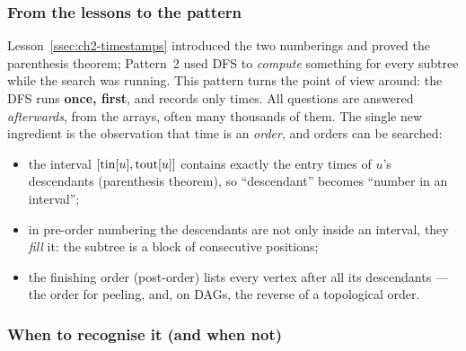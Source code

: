\subsubsection*{From the lessons to the pattern}

Lesson~\ref{ssec:ch2-timestamps} introduced the two numberings and proved the parenthesis theorem; Pattern~2 used DFS to \emph{compute} something for every subtree while the search was running. This pattern turns the point of view around: the DFS runs \textbf{once, first}, and records only times. All questions are answered \emph{afterwards}, from the arrays, often many thousands of them. The single new ingredient is the observation that time is an \emph{order}, and orders can be searched:
\begin{itemize}[leftmargin=*]
    \item the interval $[\mathrm{tin}[u], \mathrm{tout}[u]]$ contains exactly the entry times of $u$'s descendants (parenthesis theorem), so ``descendant'' becomes ``number in an interval'';
    \item in pre-order numbering the descendants are not only inside an interval, they \emph{fill} it: the subtree is a block of consecutive positions;
    \item the finishing order (post-order) lists every vertex after all its descendants --- the order for peeling, and, on DAGs, the reverse of a topological order.
\end{itemize}

\subsubsection*{When to recognise it (and when not)}

